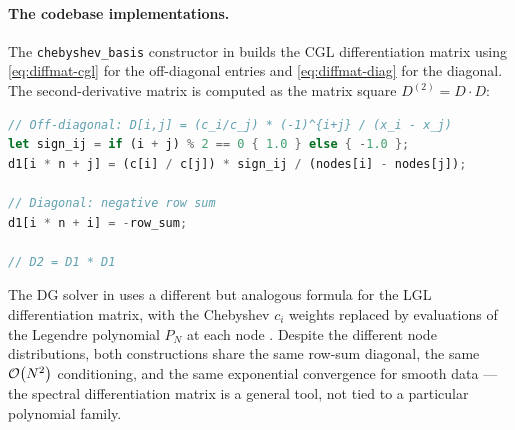 \paragraph{The codebase implementations.}

The \texttt{chebyshev\_basis} constructor in 
builds the CGL differentiation matrix using
\cref{eq:diffmat-cgl} for the off-diagonal entries and
\cref{eq:diffmat-diag} for the diagonal.  The second-derivative
matrix is computed as the matrix square $D^{(2)} = D \cdot D$:
%
\begin{lstlisting}[language=Rust]
// Off-diagonal: D[i,j] = (c_i/c_j) * (-1)^{i+j} / (x_i - x_j)
let sign_ij = if (i + j) % 2 == 0 { 1.0 } else { -1.0 };
d1[i * n + j] = (c[i] / c[j]) * sign_ij / (nodes[i] - nodes[j]);

// Diagonal: negative row sum
d1[i * n + i] = -row_sum;

// D2 = D1 * D1
\end{lstlisting}
%
The DG solver in  uses a different but analogous
formula for the LGL differentiation matrix, with the Chebyshev
$c_i$ weights replaced by evaluations of the Legendre polynomial
$P_N$ at each node \cite{HesthavenWarburton2008}.  Despite the
different node distributions, both constructions share the same
row-sum diagonal, the same $\mathcal{O}\!\left(N^2\right)$ conditioning, and the
same exponential convergence for smooth data --- the spectral
differentiation matrix is a general tool, not tied to a particular
polynomial family.
